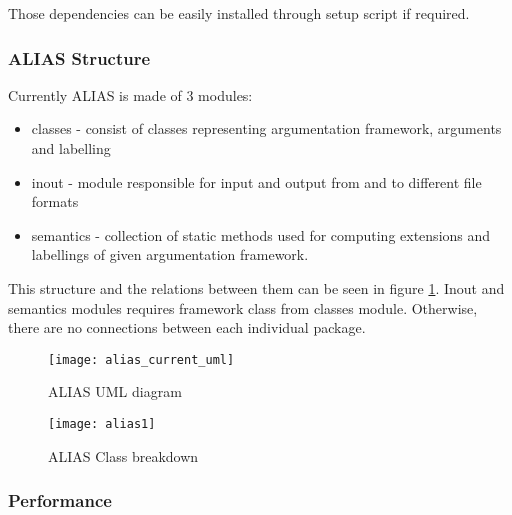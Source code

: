 Those dependencies can be easily installed through setup script if required. 

\subsubsection{ALIAS Structure}
Currently ALIAS is made of 3 modules: 

\begin{itemize}
	\item classes - consist of classes representing argumentation framework, arguments and labelling
	\item inout - module responsible for input and output from and to different file formats
	\item semantics - collection of static methods used for computing extensions and labellings of given argumentation framework.
\end{itemize}

This structure and the relations between them can be seen in figure \ref{fig:aliasUml1}. Inout and semantics modules requires framework class from classes module. Otherwise, there are no connections between each individual package.

\begin{figure}[h]
	\texttt{[image: alias\_current\_uml]}
	\caption{ALIAS UML diagram}
	\label{fig:aliasUml1}
\end{figure}



\begin{landscape}
	\begin{figure}
		\texttt{[image: alias1]}
		\caption{ALIAS Class breakdown}
		\label{fig:aliasClassBreakdown}
	\end{figure}
\end{landscape}

\subsubsection{Performance}

